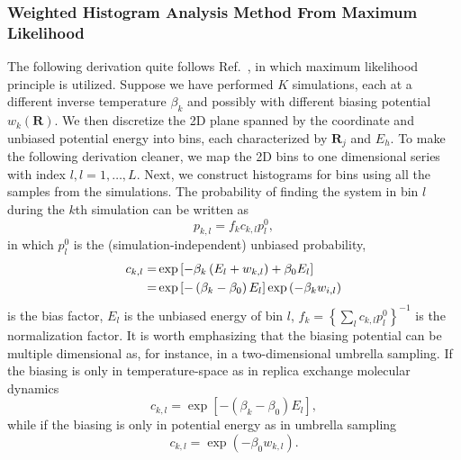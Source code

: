 \subsubsection{Weighted Histogram Analysis Method From Maximum Likelihood}
The following derivation quite follows Ref.~\cite{GallicchioJPCB2005}, in which maximum likelihood principle is utilized. 
Suppose we have performed $K$ simulations, each at a different inverse temperature $\beta_k$ and possibly with different biasing potential $w_k(\mathbf{R})$.
We then discretize the 2D plane spanned by the coordinate and unbiased potential energy into bins, each characterized by ${\mathbf{R}_j}$ and ${E_h}$. To make the following derivation cleaner, we map the 2D bins to one dimensional series with index $l, l=1,\dots,L$. Next, we construct histograms for bins using all the samples from the simulations. The probability of finding the system in bin $l$ during the $k$th simulation can be written as
\begin{equation}
p_{k,l}=f_kc_{k,l}p_l^0,
\end{equation}
in which $p_l^0$ is the (simulation-independent) unbiased probability,
\begin{align}
c_{k,l}=&\exp{\left[-\beta_k\left(E_l+w_{k,l}\right)+\beta_0E_l\right]}\notag\\
=&\exp{\left[-\left(\beta_k-\beta_0\right)E_l\right]}\exp{\left(-\beta_kw_{i,l}\right)}
\end{align}
is the bias factor, $E_l$ is the unbiased energy of bin $l$, $f_k={\left\{\sum\limits_lc_{k,l}p_l^0\right\}}^{-1}$ is the normalization factor.
It is worth emphasizing that the biasing potential can be multiple dimensional as, for instance, in a two-dimensional umbrella sampling.
If the biasing is only in temperature-space as in replica exchange molecular dynamics
\begin{equation}
c_{k,l}=\exp{\left[-\left(\beta_k-\beta_0\right)E_l\right]},
\end{equation} 
while if the biasing is only in potential energy as in umbrella sampling
\begin{equation}
c_{k,l}=\exp{\left(-\beta_0w_{k,l}\right)}.
\end{equation}

